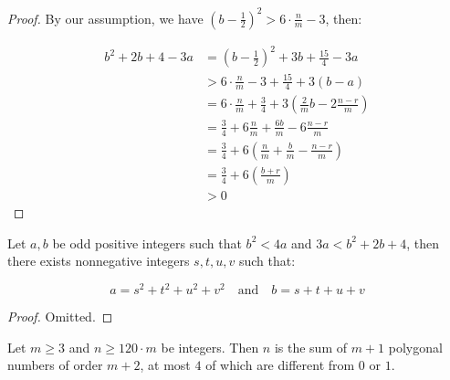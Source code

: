 \begin{proof}
    By our assumption, we have $(b-\frac{1}{2})^2>6\cdot \frac{n}{m} - 3$, then:

    \begin{align}
        b^2+2b+4-3a &= \left(b-\frac{1}{2}\right)^2 + 3b + \frac{15}{4} - 3a \\
        &> 6\cdot \frac{n}{m} - 3 + \frac{15}{4} + 3\left(b-a\right) \\
        &=6\cdot\frac{n}{m} + \frac{3}{4} + 3\left(\frac{2}{m}b - 2\frac{n-r}{m}\right) \\
        &=\frac{3}{4} + 6\frac{n}{m} + \frac{6b}{m}-6\frac{n-r}{m} \\
        &=\frac{3}{4} + 6\left(\frac{n}{m} + \frac{b}{m} - \frac{n-r}{m}\right) \\
        &=\frac{3}{4} + 6\left(\frac{b+r}{m}\right) \\
        &>0
    \end{align}
\end{proof}

\begin{lemma}
    \label{lem:CauchyLemma}
    \leanok

    Let $a,b$ be odd positive integers such that $b^2<4a$ and $3a<b^2+2b+4$, then there exists nonnegative integers $s,t,u,v$ such that:

    \[
        a=s^2+t^2+u^2+v^2 \quad \text{and} \quad b=s+t+u+v
    \]
\end{lemma}

\begin{proof}
    Omitted.
\end{proof}


%
%
\begin{theorem}
    \label{thm:thmone}
    Let $m\geq 3$ and $n\geq 120\cdot m$ be integers. Then $n$ is the sum of $m+1$ polygonal numbers of order $m+2$, at most $4$ of which are different from $0$ or $1$. 
\end{theorem}